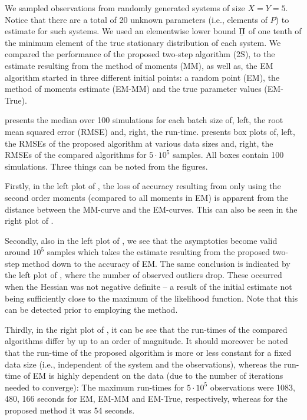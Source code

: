 \documentclass[journal]{IEEEtran}
\newcommand{\polylb}{\underaccent{\bar}{\Pi}}
\begin{document}
We sampled observations from randomly generated systems of size $X = Y = 5$.  Notice that
there are a total of 20 unknown parameters (i.e., elements of $P$) to estimate for such
systems.  We used an elementwise lower bound $\polylb$ of one tenth of the minimum element
of the true stationary distribution of each system. We compared the performance of the
proposed two-step algorithm (2S), to the estimate resulting from the method of moments
(MM), as well as, the EM algorithm started in three different initial points: a random
point (EM), the method of moments estimate (EM-MM) and the true parameter values
(EM-True). 

 presents the median over 100 simulations for each batch size of,
left, the root mean squared error (RMSE) and, right, the run-time.    presents box plots of, left, the
RMSEs of the proposed algorithm at various data sizes and, right, the RMSEs of the
compared algorithms for $5\cdot 10^5$ samples. All boxes contain 100 simulations. Three
things can be noted from the figures. 

Firstly, in the left plot of , the loss of accuracy resulting from
only using the second order moments (compared to all moments in EM) is apparent from the
distance between the MM-curve and the EM-curves. This can also be seen in the right plot
of .

Secondly, also in the left plot of , we see that the asymptotics
become valid around $10^5$ samples which takes the estimate resulting from the proposed
two-step method down to the accuracy of EM. The same conclusion is indicated by the left
plot of , where the number of observed outliers drop. These occurred
when the Hessian was not negative definite -- a result of the initial estimate not being
sufficiently close to the maximum of the likelihood function. Note that this can be
detected prior to employing the method.

Thirdly, in the right plot of , it can be see that the run-times of
the compared algorithms differ by up to an order of magnitude. It should moreover be noted
that the run-time of the proposed algorithm is more or less constant for a fixed data size
(i.e., independent of the system and the observations), whereas the run-time of EM is
highly dependent on the data (due to the number of iterations needed to converge): The
maximum run-times for $5 \cdot 10^5$ observations were 1083, 480, 166 seconds for EM,
EM-MM and EM-True, respectively, whereas for the proposed method it was 54 seconds.
\end{document}
